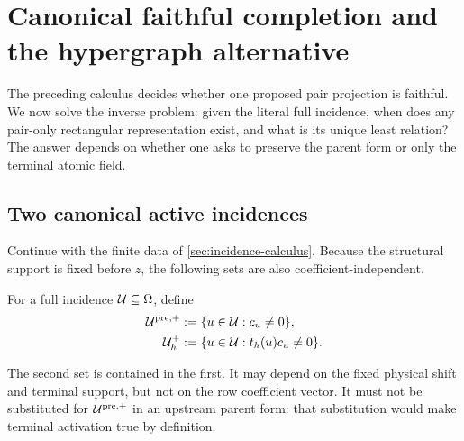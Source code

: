 \section{Canonical faithful completion and the hypergraph alternative}
\label{sec:canonical-completion}

The preceding calculus decides whether one proposed pair projection is
faithful.  We now solve the inverse problem: given the literal full
incidence, when does any pair-only rectangular representation exist, and
what is its unique least relation?  The answer depends on whether one asks
to preserve the parent form or only the terminal atomic field.

\subsection{Two canonical active incidences}

Continue with the finite data of \cref{sec:incidence-calculus}.  Because the
structural support is fixed before \(z\), the following sets are also
coefficient-independent.

\begin{definition}
\label{def:completion-active-incidences}
For a full incidence \(\mathcal U\subseteq\Omega\), define
\begin{align}
 \mathcal U^{\mathrm{pre},+}
 &:=\{u\in\mathcal U:c_u\ne0\},
 \label{eq:completion-pre-active}\\
 \mathcal U_h^+
 &:=\{u\in\mathcal U:t_h(u)c_u\ne0\}.
 \label{eq:completion-terminal-active}
\end{align}
\end{definition}

The second set is contained in the first.  It may depend on the fixed
physical shift and terminal support, but not on the row coefficient vector.
It must not be substituted for \(\mathcal U^{\mathrm{pre},+}\) in an upstream
parent form: that substitution would make terminal activation true by
definition.

